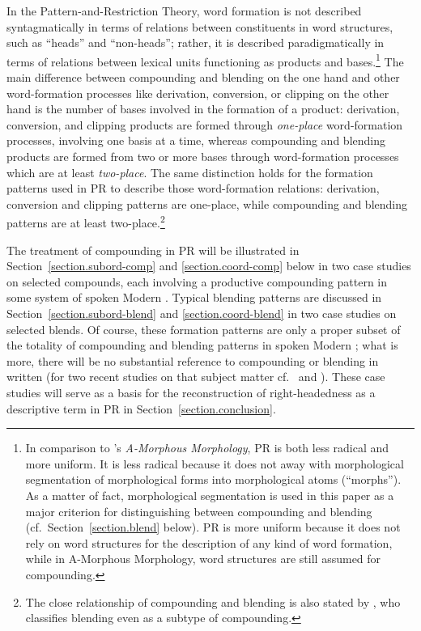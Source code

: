 \documentclass[output=paper
  ,nobabel
  ,draftmode
  ,colorlinks, citecolor=brown
]{langscibook}
\begin{document}
In the Pattern-and-Restriction Theory, word formation is not described
syntagmatically in terms of relations between constituents in word structures,
such as ``heads'' and ``non-heads''; rather,
it is described paradigmatically in terms of relations between lexical units
functioning as products and bases.\footnote{In comparison to \citeauthor{anderson:1992:a-morphous:morphology}’s \citeyearpar{anderson:1992:a-morphous:morphology} \emph{A-Morphous
Morphology}, PR is both less radical and more uniform. It is less radical
because it does not away with morphological segmentation of morphological forms
into morphological atoms (``morphs''). As a matter of fact,
morphological segmentation is used in this paper as a major criterion for
distinguishing between compounding and blending (cf.\ Section \ref{section.blend} below). PR is more uniform because it does not rely on
word structures for the description of any kind of word formation, while in
A-Morphous Morphology, word structures are still assumed for
compounding.} The main difference between compounding and
blending on the one hand and other word-formation processes like derivation,
conversion, or clipping on the other hand is the number of bases involved in the
formation of a product: derivation, conversion, and clipping products are formed
through \emph{one-place} word-formation processes, involving one basis at
a time, whereas compounding and blending products are formed from two or more
bases through word-formation processes which are at least
\emph{two-place}. The same distinction holds for the formation patterns
used in PR to describe those word-formation relations: derivation, conversion
and clipping patterns are one-place, while compounding and blending patterns are
at least two-place.\footnote{The close relationship of compounding and blending is
also stated by \citet[Chapter 4]{donalies:2002:wortbildung:deutschen}, who classifies
blending even as a subtype of compounding.}

\largerpage
The treatment of compounding in PR will be illustrated in Section \ref{section.subord-comp} and \ref{section.coord-comp} below in two case studies on selected compounds,
each involving a productive compounding pattern in some system of spoken Modern
. Typical blending patterns are discussed in Section \ref{section.subord-blend} and \ref{section.coord-blend} in two case studies on selected blends. Of
course, these formation patterns are only a proper subset of the totality of
compounding and blending patterns in spoken Modern ; what is more, there
will be no substantial reference to compounding or blending in written 
(for two recent studies on that subject matter cf.\ \citealt{scherer:2013:schreibung:fenster} and \citealt{borgwaldt:2013:fugenelemente:bindestriche}). These case studies will
serve as a basis for the reconstruction of right-headedness as a descriptive
term in PR in Section \ref{section.conclusion}.
\end{document}
